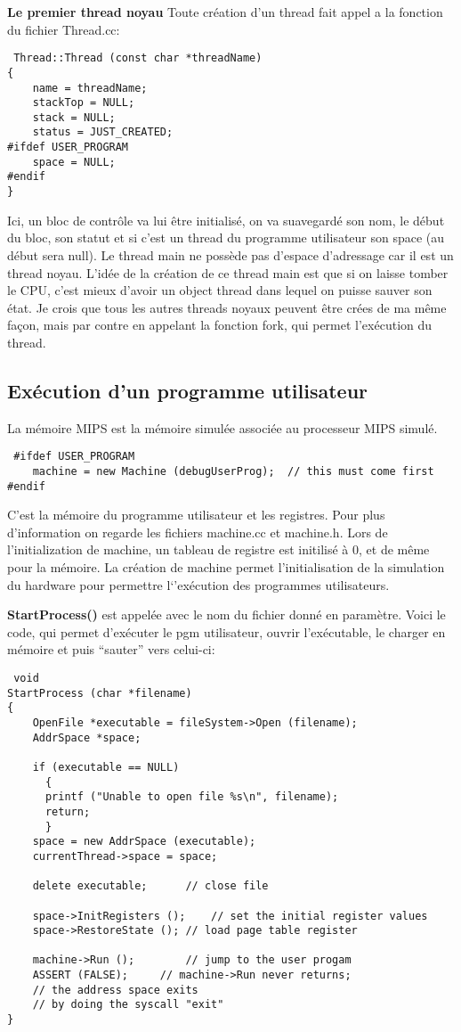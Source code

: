 \documentclass[a4paper,10pt]{article}
\begin{document}
\textbf{Le premier thread noyau} Toute création d'un thread fait appel 
a la fonction du fichier Thread.cc:

\begin{lstlisting}
 Thread::Thread (const char *threadName)
{
    name = threadName;
    stackTop = NULL;
    stack = NULL;
    status = JUST_CREATED;
#ifdef USER_PROGRAM
    space = NULL;
#endif
}
\end{lstlisting}

Ici, un bloc de contrôle va lui être initialisé, on va suavegardé son
nom, le début du bloc, son statut et si c'est un thread du programme
utilisateur son space (au début sera null). Le thread main ne 
possède pas d'espace d'adressage car il est un thread noyau. L'idée 
de la création de ce thread main est que si on laisse tomber le CPU,
c'est mieux d'avoir un object thread dans lequel on puisse sauver son
état. Je crois que tous les autres threads noyaux peuvent être crées 
de ma même façon, mais par contre en appelant la fonction fork, qui 
permet l'exécution du thread.

\subsection{Exécution d'un programme utilisateur}
La mémoire MIPS est la mémoire simulée associée au processeur MIPS
simulé.

\begin{lstlisting}
 #ifdef USER_PROGRAM
    machine = new Machine (debugUserProg);	// this must come first
#endif
\end{lstlisting}

C'est la mémoire du programme utilisateur et les registres. Pour 
plus d'information on regarde les fichiers machine.cc et machine.h. 
Lors de l'initialization de machine, un tableau de registre est 
initilisé à 0, et de même pour la mémoire. La création de machine permet
l'initialisation de la simulation du hardware pour permettre 
l`'exécution des programmes utilisateurs.

\textbf{StartProcess()} est appelée avec le nom du fichier donné en 
paramètre. Voici le code, qui permet d'exécuter le pgm utilisateur, 
ouvrir l'exécutable, le charger en mémoire et puis ``sauter'' vers celui-ci:

\begin{lstlisting}
 void
StartProcess (char *filename)
{
    OpenFile *executable = fileSystem->Open (filename);
    AddrSpace *space;

    if (executable == NULL)
      {
	  printf ("Unable to open file %s\n", filename);
	  return;
      }
    space = new AddrSpace (executable);
    currentThread->space = space;

    delete executable;		// close file

    space->InitRegisters ();	// set the initial register values
    space->RestoreState ();	// load page table register

    machine->Run ();		// jump to the user progam
    ASSERT (FALSE);		// machine->Run never returns;
    // the address space exits
    // by doing the syscall "exit"
}
\end{lstlisting}
\end{document}
